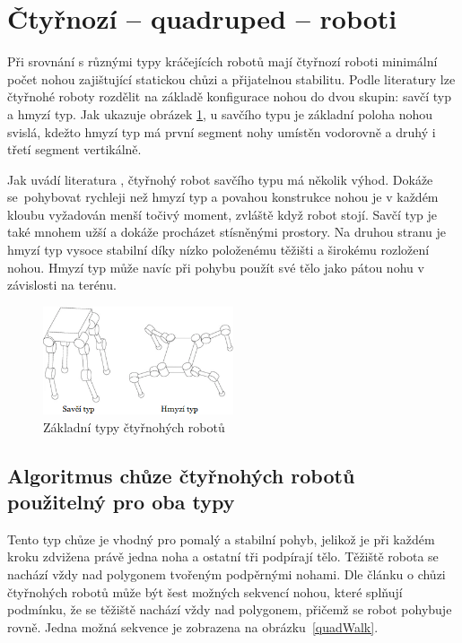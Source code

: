 \section{Čtyřnozí -- quadruped -- roboti}
Při srovnání s různými typy kráčejících robotů mají čtyřnozí roboti minimální počet nohou zajištující statickou chůzi a přijatelnou stabilitu. Podle literatury \cite{QuadrupedTitan} lze čtyřnohé roboty rozdělit na základě konfigurace nohou do dvou skupin: savčí typ a hmyzí typ. Jak ukazuje obrázek \ref{quadType}, u savčího typu je základní poloha nohou svislá, kdežto hmyzí typ má první segment nohy umístěn vodorovně a druhý i třetí segment vertikálně.

Jak uvádí literatura \cite{QuadrupedTitan}, čtyřnohý robot savčího typu má několik výhod. Dokáže se~pohybovat rychleji než hmyzí typ a povahou konstrukce nohou je v každém kloubu vyžadován menší točivý moment, zvláště když robot stojí. Savčí typ je také mnohem užší a dokáže procházet stísněnými prostory. Na druhou stranu je hmyzí typ vysoce stabilní díky nízko položenému těžišti a širokému rozložení nohou. Hmyzí typ může navíc při pohybu použít své tělo jako pátou nohu v závislosti na terénu.

\begin{figure}[hbt]
	\centering
	\includegraphics[width=0.5\textwidth]{obrazky-figures/quadTypes.png}
	\caption{Základní typy čtyřnohých robotů \cite{QuadrupedTitan}}
	\label{quadType}
\end{figure}

\subsection*{Algoritmus chůze čtyřnohých robotů použitelný pro oba typy}
Tento typ chůze je vhodný pro pomalý a stabilní pohyb, jelikož je při každém kroku zdvižena právě jedna noha a ostatní tři podpírají tělo. Těžiště robota se nachází vždy nad polygonem tvořeným podpěrnými nohami. Dle článku o chůzi čtyřnohých robotů \cite{QuadrupedWalk} může být šest možných sekvencí nohou, které splňují podmínku, že se těžiště nachází vždy nad polygonem, přičemž se robot pohybuje rovně. Jedna možná sekvence je zobrazena na obrázku~\ref{quadWalk}.

